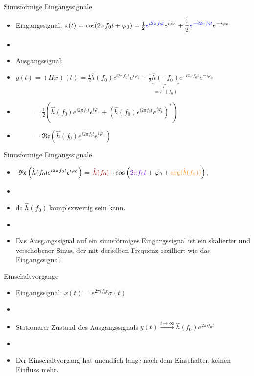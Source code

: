 \documentclass[14pt, aspectratio=169, handout]{beamer}
\begin{document}
\begin{frame}{Sinusförmige Eingangssignale}
    \begin{itemize}
    \item Eingangssignal: $x(t) = \cos(2 \pi f_0 t + \varphi_0) = \frac{1}{2} \displaystyle \textcolor{myblue}{e^{i 2 \pi f_0 t}} e^{i \varphi_0} + \frac{1}{2} \displaystyle \textcolor{myblue}{e^{-i 2 \pi f_0 t}} e^{-i \varphi_0}$
    \item[] 
    \item[] Ausgangssignal:
    \item[] $y(t) = (Hx)(t) = \frac{1}{2}\hat{h}(f_0)\displaystyle e^{i 2 \pi f_0 t} e^{i \varphi_0} + \frac{1}{2}\underbrace{\hat{h}(-f_0)}_{=\hat{h}^\ast (f_0)}e^{-i 2 \pi f_0 t} e^{-i \varphi_0}$
    \item[] $\hspace{30pt} = \frac{1}{2}\left(\hat{h}(f_0)e^{i 2 \pi f_0 t} e^{i \varphi_0} + \left(\hat{h}(f_0)e^{i 2 \pi f_0 t} \displaystyle e^{i \varphi_0}\right)^{\ast}\right)$
    \item[] $\hspace{30pt} = \displaystyle\mathfrak{Re}\left(  \hat{h}(f_0) e^{i 2 \pi f_0 t} e^{i \varphi_0} \right)$
    \end{itemize}
\end{frame}

\begin{frame}{Sinusförmige Eingangssignale}
    \begin{itemize}
        \item[] $\ \displaystyle\mathfrak{Re}\left(  \hat{h}(f_0) e^{i 2 \pi f_0 t} e^{i \varphi_0} \right) = \textcolor{myred}{|\hat{h}(f_0)|}\cdot \cos\left(\textcolor{mypurple}{2 \pi f_0 t} + \varphi_0 + \textcolor{myorange}{\text{arg}(\hat{h}(f_0))}\right)$, 
        \item[] 
        \item[] da $\hat{h}(f_0)$ komplexwertig sein kann.
        \item[] 
        \item Das Ausgangssignal auf ein sinusförmiges Eingangssignal ist ein \textcolor{myred}{skalierter} und \textcolor{myorange}{verschobener} Sinus, der mit \textcolor{mypurple}{derselben Frequenz} oszilliert wie das Eingangssignal.
    \end{itemize}
\end{frame}

\begin{frame}{Einschaltvorgänge}
    \begin{itemize}
    \item Eingangssignal: $x(t) = \displaystyle e^{2 \pi i f_0 t} \sigma(t) \hspace{15pt}$
    \item[] 
    \item Stationärer Zustand des Ausgangssignals $y(t) \displaystyle\xrightarrow{t \to \infty} \hat{h}(f_0) e^{2 \pi i f_0 t}$
    \item[] 
    \item Der Einschaltvorgang hat unendlich lange nach dem Einschalten keinen Einfluss mehr.
    \end{itemize}
\end{frame}
\end{document}
